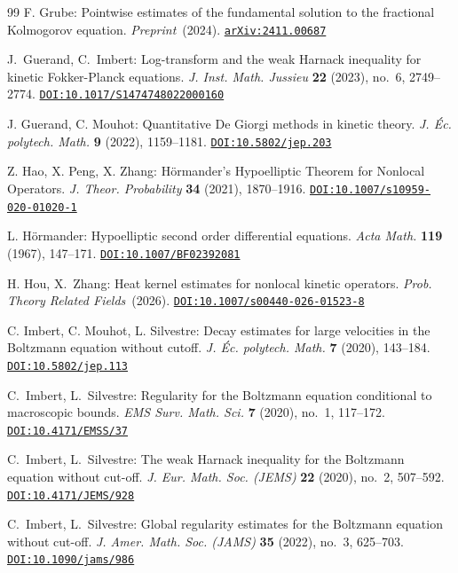 \documentclass[leqno,10pt]{amsart}
\theoremstyle{plain}
\theoremstyle{remark}
\numberwithin{equation}{section}
\def\vs{\vspace{1mm}}
\begin{document}
{\begin{thebibliography}{99}
\vs {}
{F. Grube}:
Pointwise estimates of the fundamental solution to the fractional Kolmogorov equation.
{\it Preprint}~(2024).
\href{https://arxiv.org/abs/2411.00687}{\tt  arXiv:2411.00687}

\vs {}
{J.~Guerand, C.~Imbert}:
Log-transform and the weak {H}arnack inequality for kinetic {F}okker-{P}lanck equations.
{\it J. Inst. Math. Jussieu} {\bf 22} (2023), no.~6, 2749--2774.
\href{http://dx.doi.org/10.1017/S1474748022000160}{\tt   DOI:10.1017/S1474748022000160}



\vs {}
{J. Guerand, C. Mouhot}:
Quantitative De Giorgi methods in kinetic theory.
{\it J. \'Ec. polytech. Math.} {\bf 9} (2022), 1159--1181.
\href{http://dx.doi.org/10.5802/jep.203}{\tt  DOI:10.5802/jep.203}


\vs {}
{Z. Hao, X. Peng, X. Zhang}:
H\"ormander's Hypoelliptic Theorem for Nonlocal Operators.
{\it J. Theor. Probability} {\bf 34} (2021), 1870--1916.
\href{http://dx.doi.org/10.1007/s10959-020-01020-1}{\tt   DOI:10.1007/s10959-020-01020-1}

{
\vs {}
{L. H{\"o}rmander}: Hypoelliptic second order differential equations.
{\em Acta Math.} {\bf 119} (1967), 147--171.
\href{http://dx.doi.org/10.1007/BF02392081}{\tt  DOI:10.1007/BF02392081}
}

\vs {}
{H. Hou, X.~Zhang}:
Heat kernel estimates for nonlocal kinetic operators.
{\it Prob. Theory  Related Fields}~(2026).
\href{http://dx.doi.org/10.1007/s00440-026-01523-8}{\tt  DOI:10.1007/s00440-026-01523-8}

\vs {}
{C. Imbert, C. Mouhot, L. Silvestre}:
Decay estimates for large velocities in the Boltzmann equation without cutoff.
{\it J. \'Ec. polytech. Math.} {\bf 7} (2020), 143--184.
\href{http://dx.doi.org/10.5802/jep.113}{\tt  DOI:10.5802/jep.113}

\vs {}
{C.~Imbert, L.~Silvestre}:
Regularity for the Boltzmann equation conditional to macroscopic bounds.
{\it EMS Surv. Math. Sci.} {\bf 7} (2020), no.~1, 117--172.
\href{http://dx.doi.org/10.4171/EMSS/37}{\tt  DOI:10.4171/EMSS/37}

\vs {}
{C.~Imbert, L.~Silvestre}:
The weak Harnack inequality for the Boltzmann equation without cut-off.
{\it J. Eur. Math. Soc. (JEMS)} {\bf 22} (2020), no.~2, 507--592.
\href{http://dx.doi.org/10.4171/JEMS/928}{\tt   DOI:10.4171/JEMS/928}

\vs {}
{C.~Imbert, L.~Silvestre}:
Global regularity estimates for the Boltzmann equation without cut-off.
{\it J. Amer. Math. Soc. (JAMS)} {\bf 35} (2022), no.~3, 625--703.
\href{http://dx.doi.org/10.1090/jams/986}{\tt  DOI:10.1090/jams/986}




\end{thebibliography}}
\end{document}
